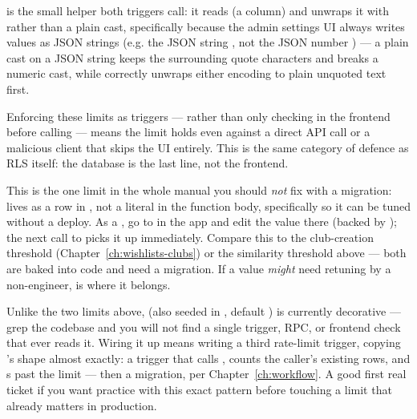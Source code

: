  is the small helper both triggers call: it reads  (a  column) and unwraps it with  rather than a plain  cast, specifically because the admin settings UI always writes values as JSON strings (e.g. the JSON string , not the JSON number ) — a plain  cast on a JSON string keeps the surrounding quote characters and breaks a numeric cast, while  correctly unwraps either encoding to plain unquoted text first.

\begin{olknote}
Enforcing these limits as  triggers — rather than only checking in the frontend before calling  — means the limit holds even against a direct API call or a malicious client that skips the UI entirely. This is the same category of defence as RLS itself: the database is the last line, not the frontend.
\end{olknote}

\begin{olkhowto}
This is the one limit in the whole manual you should \emph{not} fix with a migration:  lives as a row in , not a literal in the function body, specifically so it can be tuned without a deploy. As a , go to  in the app and edit the value there (backed by ); the next call to  picks it up immediately. Compare this to the club-creation threshold (Chapter~\ref{ch:wishlists-clubs}) or the similarity threshold above — both are baked into code and need a migration. If a value \emph{might} need retuning by a non-engineer,  is where it belongs.
\end{olkhowto}

\begin{olkhowto}
Unlike the two limits above,  (also seeded in , default ) is currently decorative — grep the codebase and you will not find a single trigger, RPC, or frontend check that ever reads it. Wiring it up means writing a third rate-limit trigger, copying 's shape almost exactly: a  trigger that calls , counts the caller's existing  rows, and s past the limit — then a migration, per Chapter~\ref{ch:workflow}. A good first real ticket if you want practice with this exact pattern before touching a limit that already matters in production.
\end{olkhowto}

